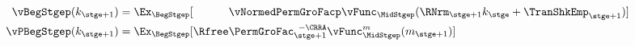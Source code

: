   \begin{equation}\begin{gathered}\begin{aligned}
        \vBegStgep({k}_{\stge+1})  & = \Ex_{\BegStgep}[\phantom{\Rfree}\vNormedPermGroFacp\null{\vFunc}_{\MidStgep}(\RNrm_{\stge+1}{k}_{\stge}+{\TranShkEmp}_{\stge+1})]  \label{eq:vBegtpdefn}
\\  {\vPBegStgep}({k}_{\stge+1})  & = \Ex_{\BegStgep}[\Rfree \PermGroFac_{\stge+1}^{\phantom{1}-\CRRA} \null{\vFunc}_{\MidStgep}^{{m}}({m}_{\stge+1})]
  \end{aligned}\end{gathered}\end{equation}

